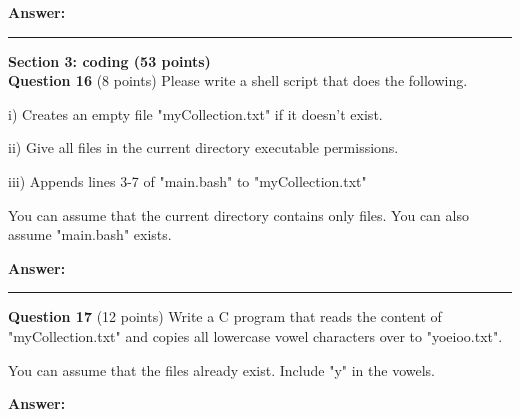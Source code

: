 \documentclass{exam}
\begin{document}
\textbf{Answer:}

\newpage




\begin{center}\noindent\rule{6in}{0.4pt}\end{center}

{\Large\textbf{Section 3: coding (53 points)}}
\\

\textbf{Question 16} (8 points) Please write a shell script that does the following.

i) Creates an empty file "myCollection.txt" if it doesn't exist.

ii) Give all files in the current directory executable permissions.

iii) Appends lines 3-7 of "main.bash" to "myCollection.txt"

You can assume that the current directory contains only files. You can also assume "main.bash" exists.

\textbf{Answer:}

\newpage




\begin{center}\noindent\rule{6in}{0.4pt}\end{center}

\textbf{Question 17} (12 points) Write a C program that reads the content of "myCollection.txt" and copies all lowercase vowel characters over to "yoeioo.txt".

You can assume that the files already exist. Include "y" in the vowels.

\textbf{Answer:}

\newpage



\end{document}
